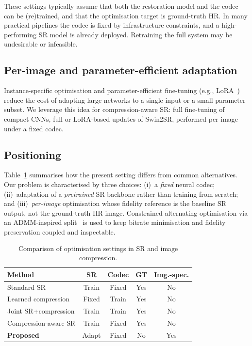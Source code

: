 These settings typically assume that both the restoration model and the codec
can be (re)trained, and that the optimisation target is ground-truth HR. In
many practical pipelines the codec is fixed by infrastructure constraints, and a
high-performing SR model is already deployed. Retraining the full system may be
undesirable or infeasible.

\subsection{Per-image and parameter-efficient adaptation}

Instance-specific optimisation and parameter-efficient fine-tuning
(e.g., LoRA~\cite{hu2021lora}) reduce the cost of adapting large networks to a
single input or a small parameter subset. We leverage this idea for
compression-aware SR: full fine-tuning of compact CNNs, full or LoRA-based
updates of Swin2SR, performed per image under a fixed codec.

\subsection{Positioning}

Table~\ref{tab:research_gap} summarises how the present setting differs from
common alternatives. Our problem is characterised by three choices:
(i)~a \emph{fixed} neural codec; (ii)~adaptation of a \emph{pretrained} SR
backbone rather than training from scratch; and (iii)~\emph{per-image}
optimisation whose fidelity reference is the baseline SR output, not the
ground-truth HR image. Constrained alternating optimisation via an
ADMM-inspired split~\cite{boyd2011admm} is used to keep bitrate minimisation
and fidelity preservation coupled and inspectable.

\begin{table}[t]
\centering
\caption{Comparison of optimisation settings in SR and image compression.}
\label{tab:research_gap}
\small
\begin{tabular}{@{}lcccc@{}}
\toprule
\textbf{Method} & \textbf{SR} & \textbf{Codec} & \textbf{GT} & \textbf{Img.-spec.} \\
\midrule
Standard SR              & Train  & Fixed  & Yes & No \\
Learned compression      & Fixed  & Train  & Yes & No \\
Joint SR+compression     & Train  & Train  & Yes & No \\
Compression-aware SR     & Train  & Fixed  & Yes & No \\
\textbf{Proposed}        & Adapt  & Fixed  & No  & Yes \\
\bottomrule
\end{tabular}
\end{table}
